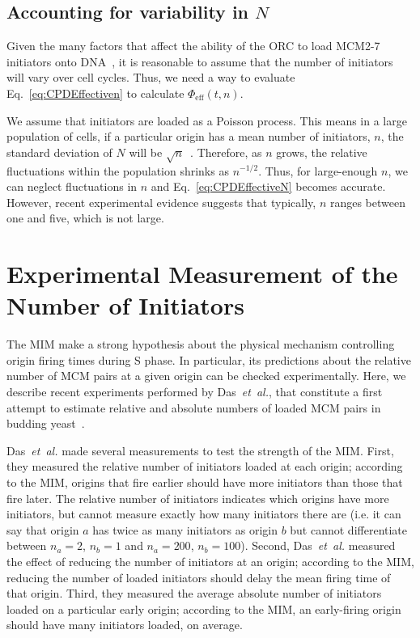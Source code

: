 {		
		\subsection{Accounting for variability in $N$}
		\label{subsec:VariableN}
		
		Given the many factors that affect the ability of the ORC to load MCM2-7 initiators onto DNA~\cite{MultiMCM}, it is reasonable to assume that the number of initiators will vary over cell cycles.
		Thus, we need a way to evaluate Eq.~\ref{eq:CPDEffectiven} to calculate $\Phi_\text{eff}(t,n)$.
		
		We assume that initiators are loaded as a Poisson process.
		This means in a large population of cells, if a particular origin has a mean number of initiators, $n$, the standard deviation of $N$ will be $\sqrt{n}$~\cite{cowan}.
		Therefore, as $n$ grows, the relative fluctuations within the population shrinks as $n^{-1/2}$.
		Thus, for large-enough $n$, we can neglect fluctuations in $n$ and Eq.~\ref{eq:CPDEffectiveN} becomes accurate.
		However, recent experimental evidence suggests that typically, $n$ ranges between one and five, which is not large.
		
	\section{Experimental Measurement of the Number of Initiators}
	\label{sec:ExperimentsMIM}
	
	The MIM make a strong hypothesis about the physical mechanism controlling origin firing times during S phase.
	In particular, its predictions about the relative number of MCM pairs at a given origin can be checked experimentally.
	Here, we describe recent experiments performed by Das~\emph{et~al.}, that constitute a first attempt to estimate relative and absolute numbers of loaded MCM pairs in budding yeast~\cite{Rhind}.
	
	Das~\emph{et~al.} made several measurements to test the strength of the MIM.
	First, they measured the relative number of initiators loaded at each origin; according to the MIM, origins that fire earlier should have more initiators than those that fire later.
	The relative number of initiators indicates which origins have more initiators, but cannot measure exactly how many initiators there are (i.e. it can say that origin $a$ has twice as many initiators as origin $b$ but cannot differentiate between $n_a=2$, $n_b=1$ and $n_a=200$, $n_b=100$).
	Second, Das~\emph{et~al.} measured the effect of reducing the number of initiators at an origin; according to the MIM, reducing the number of loaded initiators should delay the mean firing time of that origin.
	Third, they measured the average absolute number of initiators loaded on a particular early origin; according to the MIM, an early-firing origin should have many initiators loaded, on average.
		
}
